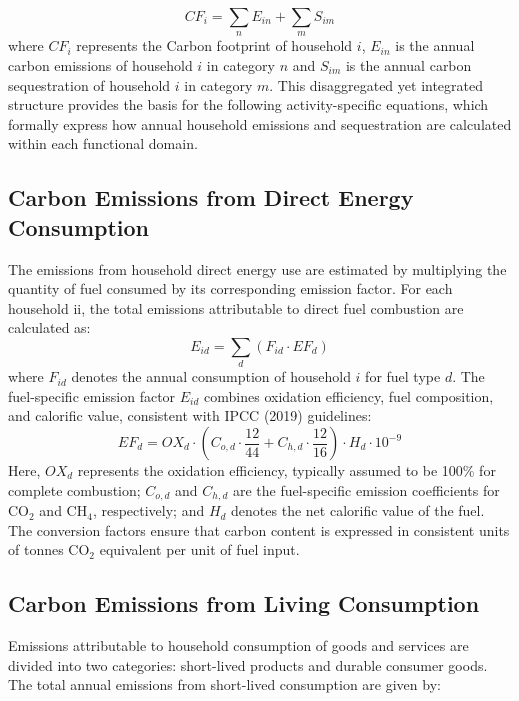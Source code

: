 \documentclass[12pt,a4paper]{article}%
\begin{document}
\begin{equation}
CF_i = \sum_{n} E_{in} + \sum_{m} S_{im}
\end{equation}
where $CF_i$ represents the Carbon footprint of household $i$, $E_{in}$ is the annual carbon emissions of household $i$ in category $n$ and $S_{im}$ is the annual carbon sequestration of household $i$ in category $m$. This disaggregated yet integrated structure provides the basis for the following activity-specific equations, which formally express how annual household emissions and sequestration are calculated within each functional domain.

\subsection{Carbon Emissions from Direct Energy Consumption}
The emissions from household direct energy use are estimated by multiplying the quantity of fuel consumed by its corresponding emission factor. For each household ii, the total emissions attributable to direct fuel combustion are calculated as:
\begin{equation}
E_{id} = \sum_d (F_{id} \cdot EF_d)
\end{equation}
where $F_{id}$ denotes the annual consumption of household $i$  for fuel type $d$. The fuel-specific emission factor $E_{id}$ combines oxidation efficiency, fuel composition, and calorific value, consistent with IPCC (2019) guidelines:
\begin{equation}
EF_d = OX_d \cdot \left(C_{o,d} \cdot \frac{12}{44} + C_{h,d} \cdot \frac{12}{16}\right) \cdot H_d \cdot 10^{-9}
\end{equation}
Here, $OX_d$ represents the oxidation efficiency, typically assumed to be 100\% for complete combustion; $C_{o,d}$ and $C_{h,d}$ are the fuel-specific emission coefficients for CO$_2$ and CH$_4$, respectively; and $H_d$ denotes the net calorific value of the fuel. The conversion factors ensure that carbon content is expressed in consistent units of tonnes CO$_2$ equivalent per unit of fuel input.

\subsection{Carbon Emissions from Living Consumption}

Emissions attributable to household consumption of goods and services are divided into two categories: short-lived products and durable consumer goods. The total annual emissions from short-lived consumption are given by:
\end{document}
